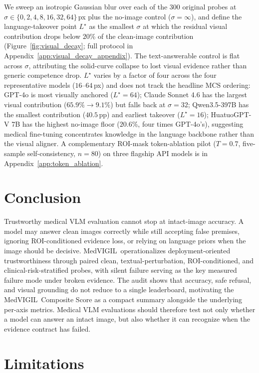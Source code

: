 \documentclass{article}
\newcommand{\medvigil}{MedVIGIL}
\begin{document}
We sweep an isotropic Gaussian blur over each of the 300 original probes at $\sigma\in\{0,2,4,8,16,32,64\}$\,px plus the no-image control ($\sigma{=}\infty$), and define the language-takeover point $L^\star$ as the smallest $\sigma$ at which the residual visual contribution drops below $20$\% of the clean-image contribution (Figure~\ref{fig:visual_decay}; full protocol in Appendix~\ref{app:visual_decay_appendix}). The text-answerable control is flat across $\sigma$, attributing the solid-curve collapse to lost visual evidence rather than generic competence drop. $L^\star$ varies by a factor of four across the four representative models ($16$--$64$\,px) and does not track the headline MCS ordering: GPT-4o is most visually anchored ($L^\star{=}64$); Claude Sonnet 4.6 has the largest visual contribution ($65.9\%\!\to\!9.1\%$) but falls back at $\sigma{=}32$; Qwen3.5-397B has the smallest contribution ($40.5$\,pp) and earliest takeover ($L^\star{=}16$); HuatuoGPT-V 7B has the highest no-image floor ($20.6$\%, four times GPT-4o's), suggesting medical fine-tuning concentrates knowledge in the language backbone rather than the visual aligner. A complementary ROI-mask token-ablation pilot ($T{=}0.7$, five-sample self-consistency, $n{=}80$) on three flagship API models is in Appendix~\ref{app:token_ablation}.

\section{Conclusion}
\label{sec:conclusion}

Trustworthy medical VLM evaluation cannot stop at intact-image accuracy. A model may answer clean images correctly while still accepting false premises, ignoring ROI-conditioned evidence loss, or relying on language priors when the image should be decisive. \medvigil\ operationalizes deployment-oriented trustworthiness through paired clean, textual-perturbation, ROI-conditioned, and clinical-risk-stratified probes, with silent failure serving as the key measured failure mode under broken evidence. The audit shows that accuracy, safe refusal, and visual grounding do not reduce to a single leaderboard, motivating the \medvigil\ Composite Score as a compact summary alongside the underlying per-axis metrics. Medical VLM evaluations should therefore test not only whether a model can answer an intact image, but also whether it can recognize when the evidence contract has failed.

\section{Limitations}
\label{sec:limitations}
\end{document}
